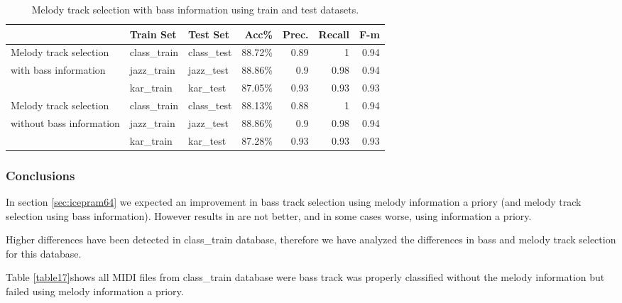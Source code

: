 \documentclass{article}
\begin{document}
\begin{table}
\begin{center}
\begin{tabular}{  l | l | l | r | r | r | r }
\hline
 & Train Set & Test Set & Acc\% & Prec. & Recall & F-m \\
\hline
\hline
Melody track selection  & class\_train & class\_test & 88.72\% & 0.89 & 1 & 0.94 \\
with bass information & jazz\_train & jazz\_test & 88.86\% & 0.9 & 0.98 & 0.94 \\
 & kar\_train & kar\_test & 87.05\% & 0.93 & 0.93 & 0.93 \\
\hline
Melody track selection  & class\_train & class\_test & 88.13\% & 0.88 & 1 & 0.94 \\
without bass information & jazz\_train & jazz\_test & 88.86\% & 0.9 & 0.98 & 0.94 \\
 & kar\_train & kar\_test & 87.28\% & 0.93 & 0.93 & 0.93 \\
\hline
\end{tabular}
\caption{Melody track selection with bass information using train and test datasets.}
\label{table16}
\end{center}
\end{table}








\subsubsection{Conclusions}

In section \ref{sec:icepram64} we expected an improvement in bass track selection using melody information a priory (and melody track selection using bass information). However results in are not better, and in some cases worse, using information a priory.

Higher differences have been detected  in class\_train database, therefore we have analyzed the differences in bass and melody track selection for this database.

Table \ref{table17}shows all MIDI files from class\_train database were bass track was properly classified without the melody information but failed using melody information a priory.
\end{document}
